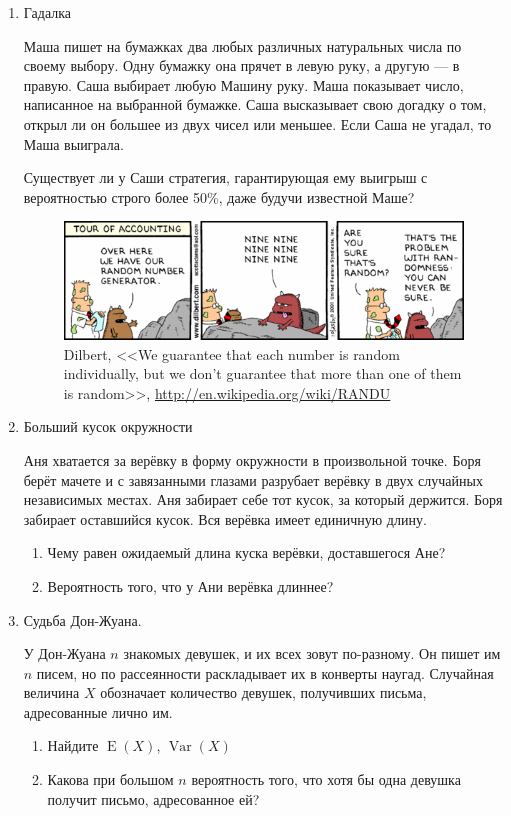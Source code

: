 \documentclass[nobib]{tufte-handout}
\DeclareMathOperator{\Var}{Var}
\DeclareMathOperator{\E}{E}
\begin{document}
\begin{enumerate}
\item Гадалка

Маша пишет на бумажках два любых различных натуральных числа по своему выбору. Одну бумажку она прячет в левую руку, а другую --- в правую. Саша выбирает любую Машину руку. Маша показывает число, написанное на выбранной бумажке. Саша высказывает свою догадку о том, открыл ли он большее из двух чисел или меньшее. Если Саша не угадал, то Маша выиграла.

Существует ли у Саши стратегия, гарантирующая ему выигрыш с вероятностью строго более 50\%, даже будучи известной Маше?

\begin{figure}
  \includegraphics[width=17cm]{ninenine.png}
  \caption{Dilbert, <<We guarantee that each number is random individually, but we don't guarantee that more than one of them is random>>, \url{http://en.wikipedia.org/wiki/RANDU}}
\end{figure}


\item Больший кусок окружности

Аня хватается за верёвку в форму окружности в произвольной точке. Боря берёт мачете и с завязанными глазами разрубает верёвку в двух случайных независимых местах. Аня забирает себе тот кусок, за который держится. Боря забирает оставшийся кусок.  Вся верёвка имеет единичную длину.
\begin{enumerate}
\item Чему равен ожидаемый длина куска верёвки, доставшегося Ане?
\item  Вероятность того, что у Ани верёвка длиннее?
\end{enumerate}


\item Судьба Дон-Жуана. 

У Дон-Жуана $n$  знакомых девушек, и их всех зовут по-разному. Он пишет
им $n$  писем, но по рассеянности раскладывает их в конверты
наугад. Случайная величина $X$ обозначает количество девушек, получивших письма, адресованные лично им.

\begin{enumerate}
\item Найдите $\E(X)$, $\Var(X)$
\item Какова при большом $n$ вероятность того, что хотя бы одна девушка получит письмо, адресованное ей?
\end{enumerate}




\end{enumerate}
\end{document}
